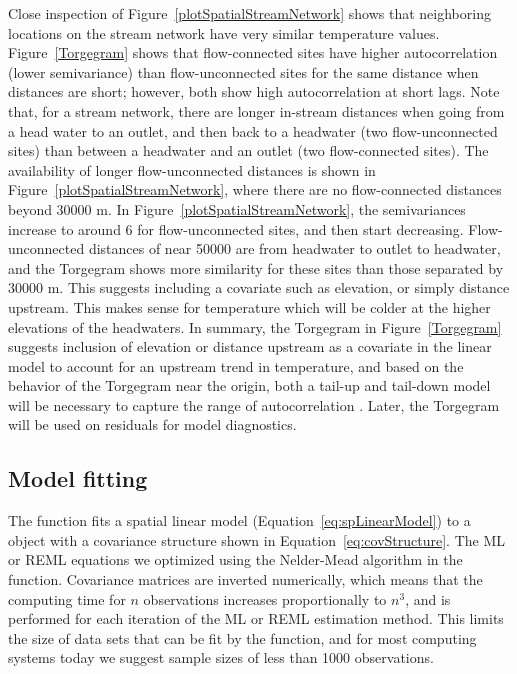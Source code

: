 \documentclass[nojss]{jss}
\begin{document}
Close inspection of Figure~\ref{plotSpatialStreamNetwork} shows that neighboring locations on the stream network have very similar temperature values. Figure~\ref{Torgegram} shows that flow-connected sites have higher autocorrelation (lower semivariance) than flow-unconnected sites for the same distance when distances are short; however, both show high autocorrelation at short lags. Note that, for a stream network, there are longer in-stream distances when going from a head water to an outlet, and then back to a headwater (two flow-unconnected sites) than between a headwater and an outlet (two flow-connected sites).  The availability of longer flow-unconnected distances is shown in Figure~\ref{plotSpatialStreamNetwork}, where there are no flow-connected distances beyond 30000 m.  In Figure~\ref{plotSpatialStreamNetwork}, the semivariances increase to around 6 for flow-unconnected sites, and then start decreasing.  Flow-unconnected distances of near 50000 are from headwater to outlet to headwater, and the Torgegram shows more similarity for these sites than those separated by 30000 m.  This suggests including a covariate such as elevation, or simply distance upstream. This makes sense for temperature which will be colder at the higher elevations of the headwaters.  In summary, the Torgegram in Figure~\ref{Torgegram} suggests inclusion of elevation or distance upstream as a covariate in the linear model to account for an upstream trend in temperature, and based on the behavior of the Torgegram near the origin, both a tail-up and tail-down model will be necessary to capture the range of autocorrelation \citep{Ver:Pete:Move:2010}.  Later, the Torgegram will be used on residuals for model diagnostics.


\subsection{Model fitting}

The  function fits a spatial linear model (Equation~\ref{eq:spLinearModel}) to a  object with a covariance structure shown in Equation~\ref{eq:covStructure}.  The ML or REML equations we optimized using the Nelder-Mead algorithm \citep{Neld:Mead:simp:1965} in the  function. Covariance matrices are inverted numerically, which means that the computing time for $n$ observations increases proportionally to $n^3$, and is performed for each iteration of the ML or REML estimation method. This limits the size of data sets that can be fit by the  function, and for most computing systems today we suggest sample sizes of less than 1000 observations.
\end{document}
